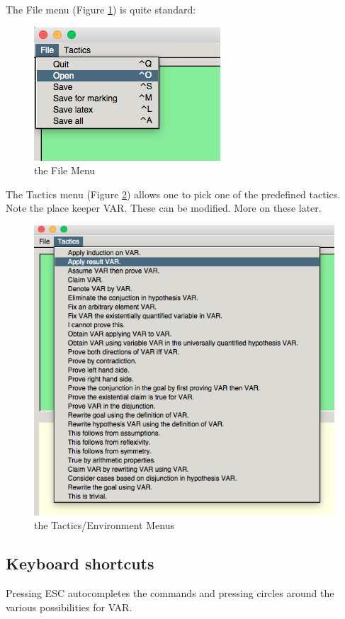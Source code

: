 The File menu (Figure \ref{file}) is quite standard:

\begin{figure}[h!]
\includegraphics[scale=0.5]{Installation/menu1.png}


\caption{the File  Menu}\label{file}
\end{figure}

The Tactics menu (Figure \ref{tactics}) allows one to pick one of the predefined tactics. 
Note the place keeper VAR. 
These can be modified. More on these later.

\begin{figure}[h!]
\includegraphics[scale=0.5]{Installation/menu2.png}


\caption{the Tactics/Environment Menus}\label{tactics}
\end{figure}
\subsection{Keyboard shortcuts}

Pressing ESC autocompletes the commands and pressing \VAR circles around the various possibilities for VAR.



